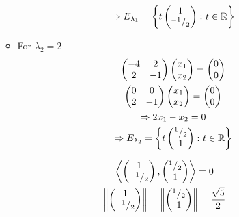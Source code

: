 \begin{enumerate}
\begin{itemize}
\begin{gather}
\Rightarrow E_{\lambda_1} = \left\{t\begin{pmatrix}1\\^{-1}/_{2}
  \end{pmatrix}\colon t \in \mathbb{R}\right\}
\end{gather}
\item For $\lambda_2 = 2$
\begin{gather}
\begin{pmatrix}
-4 & 2\\
2 & -1
\end{pmatrix}
\begin{pmatrix}
x_1\\x_2
\end{pmatrix}
=
\begin{pmatrix}
0\\0
\end{pmatrix}\\
\begin{pmatrix}
0 & 0\\
2 & -1
\end{pmatrix}
\begin{pmatrix}
x_1\\x_2
\end{pmatrix}
=
\begin{pmatrix}
0\\0
\end{pmatrix}\\
\Rightarrow 2x_1-x_2 = 0\\
\Rightarrow E_{\lambda_2} = \left\{
t\begin{pmatrix}^{1}/_{2}\\1\end{pmatrix}\colon t \in \mathbb{R}
\right\}
\end{gather}
\end{itemize}
\begin{gather}
\left\langle\begin{pmatrix}1\\\mfrac{-1}{2} \end{pmatrix}, 
\begin{pmatrix}\mfrac{1}{2}\\1\end{pmatrix}\right\rangle=0\\
\norm{\begin{pmatrix}1\\\mfrac{-1}{2} \end{pmatrix}} =
\norm{\begin{pmatrix}\mfrac{1}{2}\\1\end{pmatrix}} = \frac{\sqrt{5}}{2}

\end{gather}
\end{enumerate}
